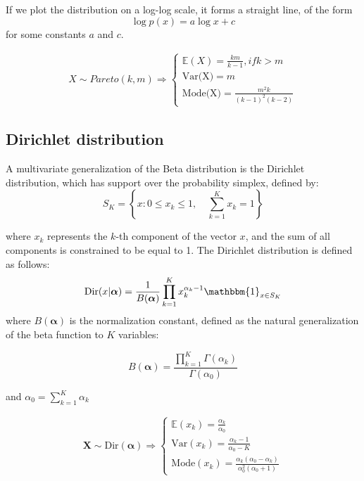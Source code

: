 \documentclass[12pt, a4paper]{article}
\theoremstyle{definition}
\numberwithin{figure}{section}
\numberwithin{equation}{section}
\numberwithin{table}{section}
\begin{document}
If we plot the distribution on a log-log scale, it forms a straight line, of the form
\[
    \log p(x) = a \log x + c
\]
for some constants $a$ and $c$.

\begin{align}
X \sim Pareto(k,m) \Rightarrow
\left\{
\begin{array}{l}
    \mathbb{E}(X)=\frac{km}{k-1}, if k>m \\ [1em]
\text{Var(X)}=m \\ [1em]
    \text{Mode(X)}=\frac{m^2 k}{(k-1)^2(k-2)}
\end{array}
\right.
\end{align}

\subsection{Dirichlet distribution}
A multivariate generalization of the Beta distribution is the Dirichlet distribution, which has support over the probability simplex, defined by:
$$S_K = \left\{ x : 0 \leq x_k \leq 1, \quad \sum_{k=1}^{K} x_k = 1 \right\}$$

where $x_k$ represents the $k$-th component of the vector $x$, and the sum of all components is constrained to be equal to 1. The Dirichlet distribution is defined as follows:
\begin{equation}
    \text{Dir}(x|\boldsymbol{\alpha}) = \frac{1}{B(\boldsymbol{\alpha})} \prod_{k=1}^{K} x_k^{\alpha_k - 1} \mathbbm{1}_{x \in S_K}
\end{equation}
where $B(\boldsymbol{\alpha})$ is the normalization constant, defined as the natural generalization of the beta function to $K$ variables:

$$B(\boldsymbol{\alpha}) =\frac{\prod_{k=1}^{K}\Gamma(\alpha_k)}{\Gamma(\alpha_0)}$$

and $\alpha_0 = \sum_{k=1}^{K} \alpha_k$

\begin{align}
\boldsymbol{X} \sim \text{Dir}(\boldsymbol{\alpha}) \Rightarrow
\left\{
\begin{array}{l}
\mathbb{E}(x_k)=\frac{\alpha_k}{\alpha_0} \\ [1em]
\text{Var}(x_k)=\frac{\alpha_{k}-1}{\alpha_{0} - K} \\ [1em]
\text{Mode}(x_k)=\frac{\alpha_k(\alpha_0 - \alpha_k)}{\alpha_0^2(\alpha_0 + 1)}
\end{array}
\right.
\end{align}
\end{document}
